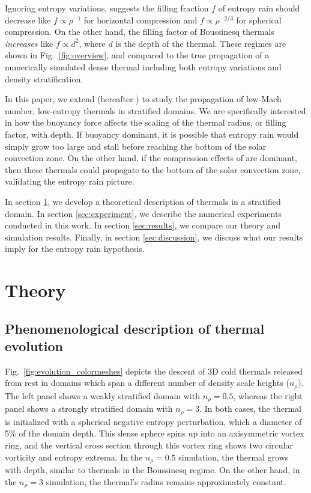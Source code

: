 \documentclass[twocolumn, amsmath, amsfonts, amssymb, trackchanges]{aastex62}
\newcommand{\LJ}{\citetalias{lecoanet&jeevanjee2018}}
\begin{document}
Ignoring entropy variations, \citet{brandenburg2016} suggests the filling fraction $f$ of entropy rain should decrease like $f \propto \rho^{-1}$ for horizontal compression and $f \propto \rho^{-2/3}$ for spherical compression.
On the other hand, the filling factor of Boussinesq thermals \emph{increases} like $f \propto d^2$, where $d$ is the depth of the thermal.
These regimes are shown in Fig.~\ref{fig:overview}, and compared to the true propagation of a numerically simulated dense thermal including both entropy variations and density stratification.

In this paper, we extend \citet{lecoanet&jeevanjee2018} (hereafter \LJ) to study the propagation of low-Mach number, low-entropy thermals in stratified domains. 
We are specifically interested in how the buoyancy force affects the scaling of the thermal radius, or filling factor, with depth. 
If buoyancy dominant, it is possible that entropy rain would simply grow too large and stall before reaching the bottom of the solar convection zone.
On the other hand, if the compression effects of \citet{brandenburg2016} are dominant, then these thermals could propagate to the bottom of the solar convection zone, validating the entropy rain picture.

In section \ref{sec:theory}, we develop a theoretical description of thermals in a stratified domain. 
In section \ref{sec:experiment}, we describe the numerical experiments conducted in this work. 
In section \ref{sec:results}, we compare our theory and simulation results. 
Finally, in section \ref{sec:discussion}, we discuss what our results imply for the entropy rain hypothesis.

\section{Theory}
\label{sec:theory}

\subsection{Phenomenological description of thermal evolution}
Fig.~\ref{fig:evolution_colormeshes} depicts the descent of 3D cold thermals released from rest in domains which span a different number of density scale heights ($n_\rho$).
The left panel shows a weakly stratified domain with $n_\rho=0.5$, whereas the right panel shows a strongly stratified domain with $n_\rho=3$.
In both cases, the thermal is initialized with a spherical negative entropy perturbation, which a diameter of 5\% of the domain depth.
This dense sphere spins up into an axisymmetric vortex ring, and the vertical cross section through this vortex ring shows two circular vorticity and entropy extrema.
In the $n_\rho = 0.5$ simulation, the thermal grows with depth, similar to thermals in the Boussinesq regime.
On the other hand, in the $n_\rho = 3$ simulation, the thermal's radius remains approximately constant.
\end{document}
